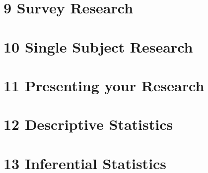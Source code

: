 \documentclass[oneside]{tufte-book}
\begin{document}
\chapter{9 Survey Research}


\chapter{10 Single Subject Research}


\chapter{11 Presenting your Research}


\chapter{12 Descriptive Statistics}


\chapter{13 Inferential Statistics}






\printindex
\end{document}
